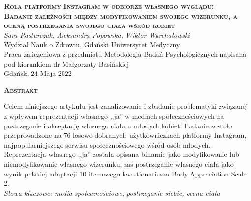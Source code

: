 \documentclass[12pt,a4paper,final,oneside,onecolumn,titlepage]{article}
\begin{document}
\pagestyle{fancy}

\begin{titlepage}
  \thispagestyle{empty}
  \begin{center}
  \vspace*{1cm}
  \Large
  \textbf{\textsc{Rola platformy Instagram w odbiorze własnego wyglądu:\\ Badanie zależności między modyfikowaniem swojego wizerunku, a oceną postrzegania swojego ciała wśród kobiet\\}}
  \vspace{1.5cm}
  \textit{Sara Pasturczak, Aleksandra Popowska, Wiktor Warchałowski\\}
  Wydział Nauk o Zdrowiu, Gdański Uniwersytet Medyczny\\
  \vspace{3cm}
  Praca zaliczeniowa z przedmiotu Metodologia Badań Psychologicznych napisana pod kierunkiem dr Małgorzaty Basińskiej\\
  \vspace{3cm}
  Gdańsk, 24 Maja 2022
  \end{center}
\end{titlepage}
\begin{center}
  \vspace*{0.5cm}
  \textbf{\textsc{Abstrakt\\}}
\end{center}
Celem niniejszego artykułu jest zanalizowanie i zbadanie problematyki związanej z wpływem reprezentacji własnego ,,ja'' w mediach społecznościowych na postrzeganie i akceptację własnego ciała u młodych kobiet. Badanie zostało przeprowadzone na 76 losowo dobranych~użytkowniczkach platformy Instagram, najpopularniejszego serwisu społecznościowego wśród osób młodych. Reprezentacja własnego ,,ja'' została opisana binarnie jako modyfikowanie lub niemodyfikowanie własnego wizerunku, zaś postrzeganie własnego ciała jako wynik polskiej adaptacji 10 itemowego kwestionariusza Body Appreciation Scale 2.\\
\textit{Słowa kluczowe: media społecznościowe, postrzeganie siebie, ocena ciała}
\end{document}
